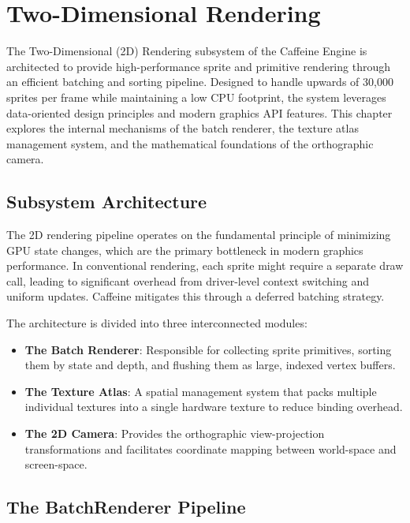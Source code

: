 \chapter{Two-Dimensional Rendering}

The Two-Dimensional (2D) Rendering subsystem of the Caffeine Engine is architected to provide high-performance sprite and primitive rendering through an efficient batching and sorting pipeline. Designed to handle upwards of 30,000 sprites per frame while maintaining a low CPU footprint, the system leverages data-oriented design principles and modern graphics API features. This chapter explores the internal mechanisms of the batch renderer, the texture atlas management system, and the mathematical foundations of the orthographic camera.

\section{Subsystem Architecture}

The 2D rendering pipeline operates on the fundamental principle of minimizing GPU state changes, which are the primary bottleneck in modern graphics performance. In conventional rendering, each sprite might require a separate draw call, leading to significant overhead from driver-level context switching and uniform updates. Caffeine mitigates this through a deferred batching strategy.

The architecture is divided into three interconnected modules:
\begin{itemize}
    \item \textbf{The Batch Renderer}: Responsible for collecting sprite primitives, sorting them by state and depth, and flushing them as large, indexed vertex buffers.
    \item \textbf{The Texture Atlas}: A spatial management system that packs multiple individual textures into a single hardware texture to reduce binding overhead.
    \item \textbf{The 2D Camera}: Provides the orthographic view-projection transformations and facilitates coordinate mapping between world-space and screen-space.
\end{itemize}

\section{The BatchRenderer Pipeline}


